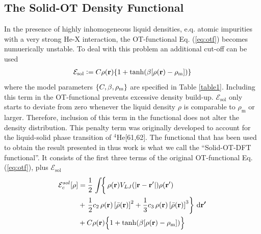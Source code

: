 \documentclass[12pt,a4paper,twosides]{book}
\renewcommand{\vec}[1]{\bm{\mathrm{#1}}}
\newcommand{\diff}[1]{\,\mathrm{d}{\vec{#1}}}
\begin{document}
		\subsection{The Solid-OT Density Functional}
			In the presence of highly inhomogeneous liquid densities, e.q. atomic impurities with a very strong He-X interaction, the OT-functional Eq. (\ref{eq:otf}) becomes numuerically unstable. To deal with this problem an additional cut-off can be used
			\begin{align}
				\mathcal{E}_\mathrm{sol} \vcentcolon= C\rho(\vec{r})\qty{1+\tanh(\beta\qty[\rho(\vec{r})-\rho_\mathrm{m}])}
			\end{align}
			where the model parameters $\qty{C,\beta,\rho_\mathrm{m}}$ are specified in Table \ref{table1}. Including this term in the OT-functional prevents excessive density build-up. $\mathcal{E}_\mathrm{sol}$ only starts to deviate from zero whenever the liquid density $\rho$ is comparable to $\rho_\mathrm{m}$ or larger. Therefore, inclusion of this term in the functional does not alter the density distribution. This penalty term was originally developed to account for the liquid-solid phase transition of $^4$He[61,62]. The functional that has been used to obtain the result presented in thus work is what we call the ``Solid-OT-DFT functional''. It consists of the first three terms of the original OT-functional Eq. (\ref{eq:otf}), plus $\mathcal{E}_\mathrm{sol}$
			\begin{align}
				{\cal E}_c^{sol}[\rho] &=  
				\frac{1}{2} \left.\int \! \right\{\rho({\bf r}) V_{LJ}(|{\bf r}-{\bf r'}|) \rho({\bf r'}) \nonumber \\
				&+ \left.\frac{1}{2} c_2\, \rho({\bf r}) \left[{\bar \rho}({\bf r}) \right]^2 
				+ \frac{1}{3} c_3 \, \rho({\bf r}) \left[ {\bar \rho}({\bf r}) \right]^3\right\}\diff{r'} \nonumber \\
				&+ C\rho(\vec{r})\qty\Big{1+\tanh(\beta\qty[\rho(\vec{r})-\rho_\mathrm{m}])} \label{eq:solid-otf}
			\end{align}
\end{document}
